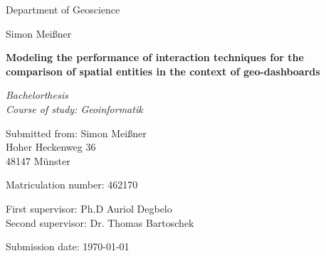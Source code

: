 \documentclass[fontsize=12pt,parskip=half,listof=totoc]{scrreprt}
\author{Simon Meißner}
\date{November 2023}
\begin{document}
\begin{titlepage}
    \sffamily
    \begin{center}
        \vspace{.5cm}
        
        {\large Department of Geoscience}
        \vspace{2cm}

        \begin{spacing}{1.5}
            {\Large Simon Meißner}
            \vspace{.5cm}

            {\Large \textbf{Modeling the performance of interaction techniques for
                            the comparison of spatial entities in the context of
                            geo-dashboards}}
            \vspace{.5cm}

            {\large \textit{Bachelorthesis\\Course of study: Geoinformatik}}
        \end{spacing}
    \end{center}
    \vfill

    Submitted from:         \tabto{5cm} Simon Meißner\\
                            \tabto{5cm} Hoher Heckenweg 36\\
                            \tabto{5cm} 48147 Münster

    Matriculation number:   \tabto{5cm} 462170

    First supervisor:       \tabto{5cm} Ph.D Auriol Degbelo\\
    Second supervisor:      \tabto{5cm} Dr. Thomas Bartoschek

    Submission date:        \tabto{5cm} \today
\end{titlepage}


\newpage
\tableofcontents
\clearpage

\pagestyle{headings}












\end{document}
